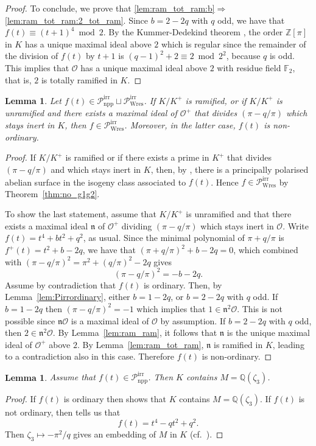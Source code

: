 \documentclass[11pt]{amsart}
\newcommand\F{\mathbb{F}}
\newcommand\Q{\mathbb{Q}}
\newcommand\Z{\mathbb{Z}}
\newcommand\cO{\mathcal{O}}
\newcommand\frn{\mathfrak{n}}
\theoremstyle{plain}
\newtheorem{lemma}[theorem]{Lemma}
\theoremstyle{definition}
\newcommand\PirrA{\mathcal{P}^\mathrm{irr}_\mathrm{npp}}
\newcommand\PirrB{\mathcal{P}^\mathrm{irr}_\mathrm{Wres}}
\begin{document}
\begin{proof}
    To conclude, we prove that \ref{lem:ram_tot_ram:b}$\Rightarrow$\ref{lem:ram_tot_ram:2_tot_ram}. 
    Since $b=2-2q$ with $q$ odd, we have that $f(t) \equiv (t+1)^4 \bmod 2$.
    By the Kummer-Dedekind theorem \cite[Thm.~8.2]{Stevenhagen08}, the order $\Z[\pi]$ in $K$ has a unique maximal ideal above $2$ which is regular since the remainder of the division of $f(t)$ by $t+1$ is $(q-1)^2+2 \equiv 2 \bmod 2^2$, because $q$ is odd.
    This implies that $\cO$ has a unique maximal ideal above $2$ with residue field $\F_2$, that is, $2$ is totally ramified in $K$.
\end{proof}

\begin{lemma}\label{lem:if_ram_then_B}
    Let $f(t)\in \PirrA\sqcup\PirrB$.
    If $K/K^+$ is ramified, or if $K/K^+$ is unramified and there exists a maximal ideal of $\cO^+$ that divides $(\pi-q/\pi)$ which stays inert in $K$, then $f\in \PirrB$.
    Moreover, in the latter case, $f(t)$ is non-ordinary.
\end{lemma}
\begin{proof}
    If $K/K^+$ is ramified or if there exists a prime in $K^+$ that divides $(\pi-q/ \pi)$ and which stays inert in $K$, then, by \cite[Thm.~1.1]{Howe96}, there is a principally polarised abelian surface in the isogeny class associated to $f(t)$.
    Hence $f\in \PirrB$ by Theorem~\ref{thm:no_g1g2}.

    To show the last statement, assume that $K/K^+$ is unramified and that there exists a maximal ideal $\frn$ of $\cO^+$ dividing $(\pi-q/\pi)$ which stays inert in $\cO$.
    Write $f(t) = t^4 + bt^2 +q^2$, as usual.
    Since the minimal polynomial of $\pi+q/\pi$ is $f^+(t) = t^2 + b -2q$, we have that $(\pi+q/\pi)^2 + b -2q =0$, which combined with $(\pi-q/\pi)^2 = \pi^2 +(q/\pi)^2 -2q$ gives 
    \[ (\pi-q/\pi)^2 = -b - 2q. \]
    Assume by contradiction that $f(t)$ is ordinary.
    Then, by Lemma~\ref{lem:Pirrordinary}, either $b=1-2q$, or $b=2-2q$ with $q$ odd.
    If $b=1-2q$ then $(\pi-q/\pi)^2 = -1$ which implies that $1 \in \frn^2\cO$. 
    This is not possible since $\frn\cO$ is a maximal ideal of $\cO$ by assumption.
    If $b=2-2q$ with $q$ odd, then $2 \in \frn^2\cO$.
    By Lemma~\ref{lem:ram_ram}, it follows that $\frn$ is the unique maximal ideal of $\cO^+$ above $2$.
    By Lemma~\ref{lem:ram_tot_ram}, $\frn$ is ramified in $K$, leading to a contradiction also in this case.
    Therefore $f(t)$ is non-ordinary.
\end{proof}

\begin{lemma}\label{lemma:MinK}
    Assume that $f(t) \in \PirrA$.
    Then $K$ contains $M=\Q(\zeta_3)$.
\end{lemma}
\begin{proof}
    If $f(t)$ is ordinary then \cite[proof of Lemma~12.2]{Howe95} shows that $K$ contains $M=\Q(\zeta_3)$. 
    If $f(t)$ is not ordinary, then \cite[Thm.~2]{HMNR08} tells us that 
    \[ f(t) = t^4 -qt^2 + q^2. \]
    Then $\zeta_3 \mapsto -\pi^2/q$ gives an embedding of $M$ in $K$ (cf.~\cite[Sec.~4]{HMNR08}).
\end{proof}
\end{document}
